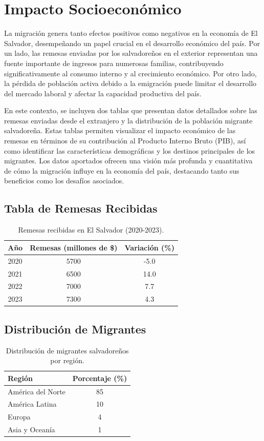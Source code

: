 \documentclass[conference]{IEEEtran}
\begin{document}
\section{Impacto Socioeconómico}
La migración genera tanto efectos positivos como negativos en la economía de El Salvador, desempeñando un papel crucial en el desarrollo económico del país. Por un lado, las remesas enviadas por los salvadoreños en el exterior representan una fuente importante de ingresos para numerosas familias, contribuyendo significativamente al consumo interno y al crecimiento económico. Por otro lado, la pérdida de población activa debido a la emigración puede limitar el desarrollo del mercado laboral y afectar la capacidad productiva del país.

En este contexto, se incluyen dos tablas que presentan datos detallados sobre las remesas enviadas desde el extranjero y la distribución de la población migrante salvadoreña. Estas tablas permiten visualizar el impacto económico de las remesas en términos de su contribución al Producto Interno Bruto (PIB), así como identificar las características demográficas y los destinos principales de los migrantes. Los datos aportados ofrecen una visión más profunda y cuantitativa de cómo la migración influye en la economía del país, destacando tanto sus beneficios como los desafíos asociados.
\subsection{Tabla de Remesas Recibidas}
\begin{table}[H]
\caption{Remesas recibidas en El Salvador (2020-2023).}
\label{table_remesas}
\centering
\begin{tabular}{|c|c|c|}
\hline
Año & Remesas (millones de \$) & Variación (\%) \\ \hline
2020 & 5700 & -5.0 \\ \hline
2021 & 6500 & 14.0 \\ \hline
2022 & 7000 & 7.7 \\ \hline
2023 & 7300 & 4.3 \\ \hline
\end{tabular}
\end{table}

\subsection{Distribución de Migrantes}
\begin{table}[H]
\caption{Distribución de migrantes salvadoreños por región.}
\label{table_migrantes}
\centering
\begin{tabular}{|l|c|}
\hline
Región & Porcentaje (\%) \\ \hline
América del Norte & 85 \\ \hline
América Latina & 10 \\ \hline
Europa & 4 \\ \hline
Asia y Oceanía & 1 \\ \hline
\end{tabular}
\end{table}
\end{document}
